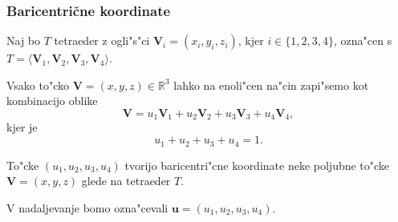 \documentclass[10pt]{beamer}
\theoremstyle{definition}
\begin{document}
\begin{frame}
  
  \frametitle{Baricentrične koordinate}
    Naj bo $T$ tetraeder z ogli"s"ci $\textbf{V}_{i} = (x_{i}, y_{i}, z_{i})$, kjer $i \in \{1, 2, 3, 4\}$, ozna"cen s 
    $T = \langle\textbf{V}_{1}, \textbf{V}_{2}, \textbf{V}_{3}, \textbf{V}_{4}\rangle.$
    \pause
  \begin{block}{}
    Vsako to"cko $\textbf{V} = (x, y, z) \in \mathbb{R}^{3}$  lahko na enoli"cen na"cin zapi"semo kot kombinacijo oblike
    \begin{equation*}
    \textbf{V} = u_{1}\textbf{V}_{1} + u_{2}\textbf{V}_{2} + u_{3}\textbf{V}_{3} + u_{4}\textbf{V}_{4},
    \end{equation*}
    kjer je
    $$
    u_{1} + u_{2} + u_{3} + u_{4} = 1.
    $$
  \end{block}
  \pause
  \vspace{0.2cm}
    To"cke $(u_{1}, u_{2}, u_{3}, u_{4})$ tvorijo 
    baricentri"cne koordinate neke poljubne to"cke 
    $\textbf{V} = (x, y, z)$ glede na tetraeder $T$.
    \vspace{0.2cm}
    \pause

    V nadaljevanje bomo ozna"cevali $\textbf{u} = (u_{1}, u_{2}, u_{3}, u_{4})$. 
\end{frame}
\end{document}
